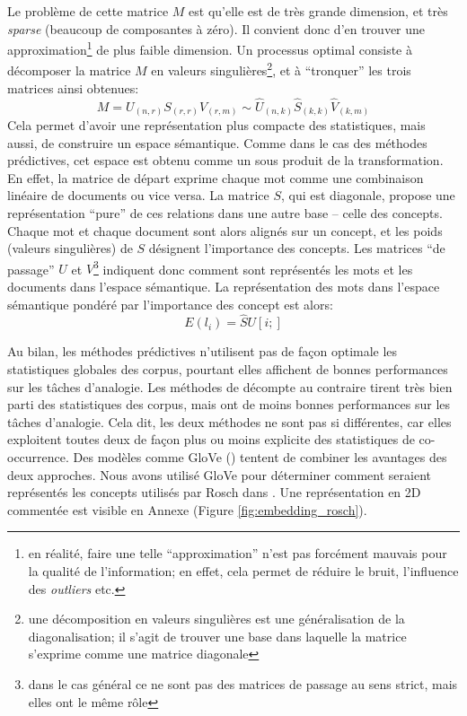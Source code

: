 \documentclass[french]{article}
\begin{document}
			Le problème de cette matrice $M$ est qu'elle est de très grande dimension, et très \textit{sparse} (beaucoup de composantes à zéro). Il convient donc d'en trouver une approximation\footnote{en réalité, faire une telle ``approximation'' n'est pas forcément mauvais pour la qualité de l'information; en effet, cela permet de réduire le bruit, l'influence des \textit{outliers} etc.} de plus faible dimension. Un processus optimal consiste à décomposer la matrice $M$ en valeurs singulières\footnote{une décomposition en valeurs singulières est une généralisation de la diagonalisation; il s'agit de trouver une base dans laquelle la matrice s'exprime comme une matrice diagonale}, et à ``tronquer'' les trois matrices ainsi obtenues:
			\begin{equation*}
			M = U_{(n, r)} S_{(r, r)} V_{(r, m)} \sim \hat U_{(n, k)} \hat S_{(k, k)} \hat V_{(k, m)}
			\end{equation*}
			Cela permet d'avoir une représentation plus compacte des statistiques, mais aussi, de construire un espace sémantique. Comme dans le cas des méthodes prédictives, cet espace est obtenu comme un sous produit de la transformation. En effet, la matrice de départ exprime chaque mot comme une combinaison linéaire de documents ou vice versa. La matrice $S$, qui est diagonale, propose une représentation ``pure'' de ces relations dans une autre base -- celle des concepts. Chaque mot et chaque document sont alors alignés sur un concept, et les poids (valeurs singulières) de $S$ désignent l'importance des concepts. Les matrices ``de passage'' $U$ et $V$\footnote{dans le cas général ce ne sont pas des matrices de passage au sens strict, mais elles ont le même rôle} indiquent donc comment sont représentés les mots et les documents dans l'espace sémantique. La représentation des mots dans l'espace sémantique pondéré par l'importance des concept est alors:
			\begin{equation}
				E(l_i) = \hat S U[i;]
			\end{equation}
			
			Au bilan, les méthodes prédictives n'utilisent pas de façon optimale les statistiques globales des corpus, pourtant elles affichent de bonnes performances sur les tâches d'analogie. Les méthodes de décompte au contraire tirent très bien parti des statistiques des corpus, mais ont de moins bonnes performances sur les tâches d'analogie. Cela dit, les deux méthodes ne sont pas si différentes, car elles exploitent toutes deux de façon plus ou moins explicite des statistiques de co-occurrence. Des modèles comme GloVe (\cite{pennington2014}) tentent de combiner les avantages des deux approches. Nous avons utilisé GloVe pour déterminer comment seraient représentés les concepts utilisés par Rosch dans \cite{rosch1975}. Une représentation en 2D commentée est visible en Annexe (Figure \ref{fig:embedding_rosch}).
		
\end{document}
